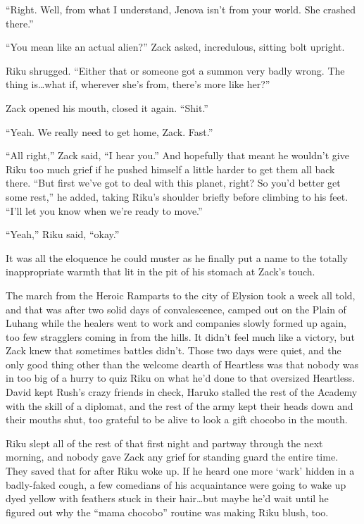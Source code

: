 ``Right. Well, from what I understand, Jenova isn't from your world. She crashed there.''

``You mean like an actual alien?'' Zack asked, incredulous, sitting bolt upright.

Riku shrugged. ``Either that or someone got a summon very badly wrong. The thing is\ldots what if, wherever she's from, there's more like her?''

Zack opened his mouth, closed it again. ``Shit.''

``Yeah. We really need to get home, Zack. Fast.''

``All right,'' Zack said, ``I hear you.'' And hopefully that meant he wouldn't give Riku too much grief if he pushed himself a little harder to get them all back there. ``But first we've got to deal with this planet, right? So you'd better get some rest,'' he added, taking Riku's shoulder briefly before climbing to his feet. ``I'll let you know when we're ready to move.''

``Yeah,'' Riku said, ``okay.''

It was all the eloquence he could muster as he finally put a name to the totally inappropriate warmth that lit in the pit of his stomach at Zack's touch.


\scenechange


The march from the Heroic Ramparts to the city of Elysion took a week all told, and that was after two solid days of convalescence, camped out on the Plain of Luhang while the healers went to work and companies slowly formed up again, too few stragglers coming in from the hills. It didn't feel much like a victory, but Zack knew that sometimes battles didn't. Those two days were quiet, and the only good thing other than the welcome dearth of Heartless was that nobody was in too big of a hurry to quiz Riku on what he'd done to that oversized Heartless. David kept Rush's crazy friends in check, Haruko stalled the rest of the Academy with the skill of a diplomat, and the rest of the army kept their heads down and their mouths shut, too grateful to be alive to look a gift chocobo in the mouth.

Riku slept all of the rest of that first night and partway through the next morning, and nobody gave Zack any grief for standing guard the entire time. They saved that for after Riku woke up. If he heard one more `wark' hidden in a badly-faked cough, a few comedians of his acquaintance were going to wake up dyed yellow with feathers stuck in their hair\ldots but maybe he'd wait until he figured out why the ``mama chocobo'' routine was making Riku blush, too.

